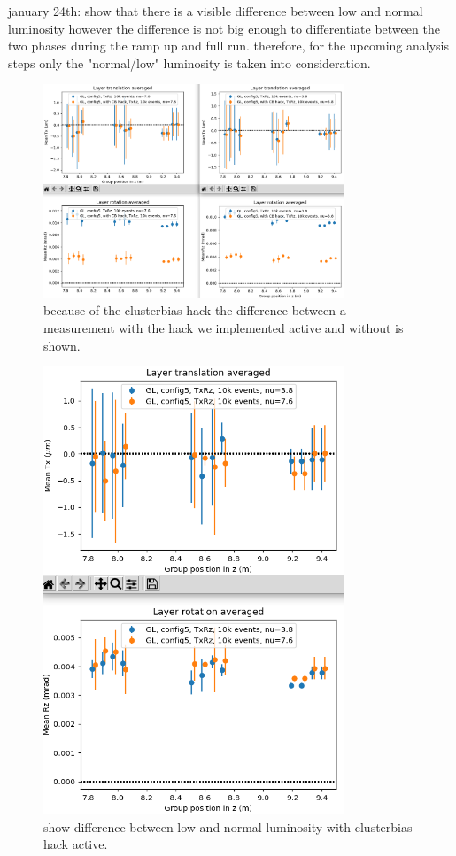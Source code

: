 january 24th: show that there is a visible difference between low and normal luminosity however the difference is not big enough to differentiate between the two phases during the ramp up and full run. therefore, for the upcoming analysis steps only the "normal/low" luminosity is taken into consideration.

\begin{figure}
  \centering
  \includegraphics[width=0.8\textwidth]{plots/jan_24_2022/compare_with_without_hack.png}
  \caption{because of the clusterbias hack the difference between a measurement with the hack we implemented active and without is shown.}
  \label{fig:cbhack_on_off}
\end{figure}

\begin{figure}
  \centering
  \includegraphics[width=0.8\textwidth]{plots/jan_24_2022/low_normal_with_hack.png}
  \caption{show difference between low and normal luminosity with clusterbias hack active.}
  \label{fig:lumi_low_normal_hack_on}
\end{figure}

